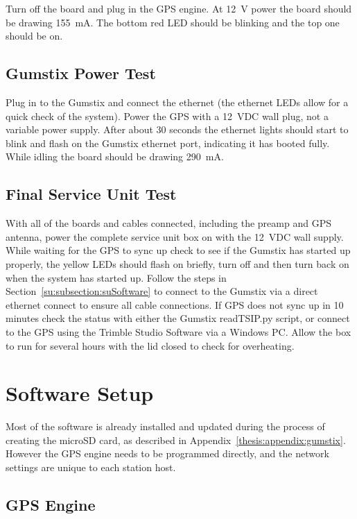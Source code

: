 Turn off the board and plug in the GPS engine.
At 12~V power the board should be drawing 155~mA.
The bottom red LED should be blinking and the top one should be on.

\subsection{Gumstix Power Test}
\label{su:subsection:suTest3}

Plug in to the Gumstix and connect the ethernet (the ethernet LEDs allow for a quick check of the system).
Power the GPS with a 12~VDC wall plug, not a variable power supply.
After about 30 seconds the ethernet lights should start to blink and flash on the Gumstix ethernet port, indicating it has booted fully.
While idling the board should be drawing 290~mA.

\subsection{Final Service Unit Test}
\label{su:subsection:suTest4}

With all of the boards and cables connected, including the preamp and GPS antenna, power the complete service unit box on with the 12~VDC wall supply.
While waiting for the GPS to sync up check to see if the Gumstix has started up properly, the yellow LEDs should flash on briefly, turn off and then turn back on when the system has started up.
Follow the steps in Section~\ref{su:subsection:suSoftware} to connect to the Gumstix via a direct ethernet connect to ensure all cable connections.
If GPS does not sync up in 10 minutes check the status with either the Gumstix readTSIP.py script, or connect to the GPS using the Trimble Studio Software via a Windows PC.
Allow the box to run for several hours with the lid closed to check for overheating.

\section{Software Setup}

Most of the software is already installed and updated during the process of creating the microSD card, as described in Appendix~\ref{thesis:appendix:gumstix}.
However the GPS engine needs to be programmed directly, and the network settings are unique to each station host.

\subsection{GPS Engine}

